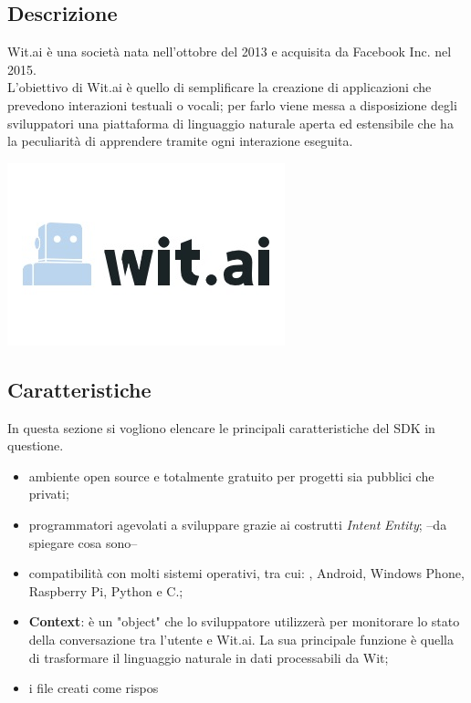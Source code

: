 \documentclass[a4paper,titlepage]{article}
\begin{document}
	\subsection{Descrizione}
		\begin{minipage}{0.7\textwidth}\raggedright
			Wit.ai è una società nata nell'ottobre del 2013 e acquisita da Facebook Inc. nel 2015. \\
			L'obiettivo di Wit.ai è quello di semplificare la creazione di applicazioni che prevedono interazioni testuali o vocali; per farlo viene messa a disposizione degli sviluppatori una piattaforma di linguaggio naturale aperta ed estensibile che ha la peculiarità di apprendere tramite ogni interazione eseguita.
		\end{minipage}
		\hfill
		\noindent\begin{minipage}{0.15\textwidth}
		\includegraphics[scale=0.6]{images/witai.jpg}
		\end{minipage}
		\subsection{Caratteristiche}
In questa sezione si vogliono elencare le principali caratteristiche del SDK in questione.
\begin{itemize}
	\item ambiente open source e totalmente gratuito per progetti sia pubblici che privati;
	\item programmatori agevolati a sviluppare grazie ai costrutti \textit{Intent} \textit{Entity}; --da spiegare cosa sono--
	\item compatibilità con molti sistemi operativi, tra cui: , Android, Windows Phone, Raspberry Pi, Python e C.;
	\item \textbf{Context}: è un "object" che lo sviluppatore utilizzerà per monitorare lo stato della conversazione tra l'utente e Wit.ai. La sua principale funzione è quella di trasformare il linguaggio naturale in dati processabili da Wit;
	\item i file creati come rispos
	
\end{itemize}	
		
\end{document}

